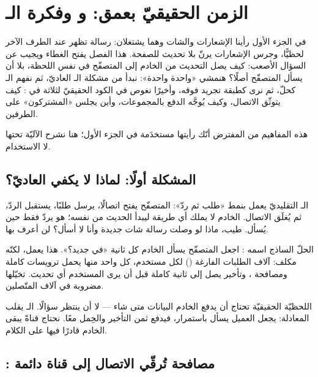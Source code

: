 \section{الزمن الحقيقيّ بعمق:  و وفكرة الـ }

في الجزء الأول رأينا الإشعارات والشات وهما يشتغلان: رسالة تظهر عند الطرف
الآخر لحظيًّا، وجرس الإشعارات يرنّ بلا تحديث للصفحة. هذا الفصل يفتح الغطاء ويجيب
عن السؤال الأصعب: كيف يصل التحديث من الخادم إلى المتصفّح في نفس اللحظة،
بلا أن يسأل المتصفّح أصلًا؟ هنمشي «واحدة واحدة»: نبدأ من مشكلة الـ 
العاديّ، ثم نفهم الـ  كحلّ، ثم نرى  كطبقة تجريد فوقه،
وأخيرًا نغوص في الكود الحقيقيّ لثلاثة  في : كيف يتوثّق
الاتصال، وكيف يُوجَّه الدفع بالمجموعات، وأين يجلس «المشتركون» على الطرفين.

هذه المفاهيم من المفترض أنّك رأيتها مستخدَمة في الجزء الأول؛ هنا نشرح الآليّة
تحتها لا الاستخدام.

\subsection{المشكلة أولًا: لماذا لا يكفي  العاديّ؟}

الـ  التقليديّ يعمل بنمط «طلب ثم ردّ»: المتصفّح يفتح اتصالًا، يرسل
طلبًا، يستقبل الردّ، ثم يُغلَق الاتصال. الخادم لا يملك أي طريقة ليبدأ
الحديث من نفسه؛ هو يردّ فقط حين يُسأل. طيب، ماذا لو وصلت رسالة شات جديدة وأنا لا
أسأل؟ لن أعرف بها.

الحلّ الساذج اسمه : اجعل المتصفّح يسأل الخادم كل ثانية «في جديد؟».
هذا يعمل، لكنّه مكلف: آلاف الطلبات الفارغة () لكل مستخدم، كل واحد منها
يحمل ترويسات  كاملة ومصافحة ، وتأخير يصل إلى ثانية كاملة قبل أن
يرى المستخدم أي تحديث. تخيّلها مضروبة في آلاف المتّصلين.

\begin{why}
اللحظيّة الحقيقيّة تحتاج أن يدفع الخادم البيانات متى شاء — لا أن ينتظر
سؤالًا. الـ  يقلب المعادلة: يجعل العميل يسأل باستمرار، فيدفع
ثمن التأخير والحِمل معًا. نحتاج قناةً يبقى الخادم قادرًا فيها على الكلام.
\end{why}

\subsection{: مصافحة تُرقّي الاتصال إلى قناة دائمة}


